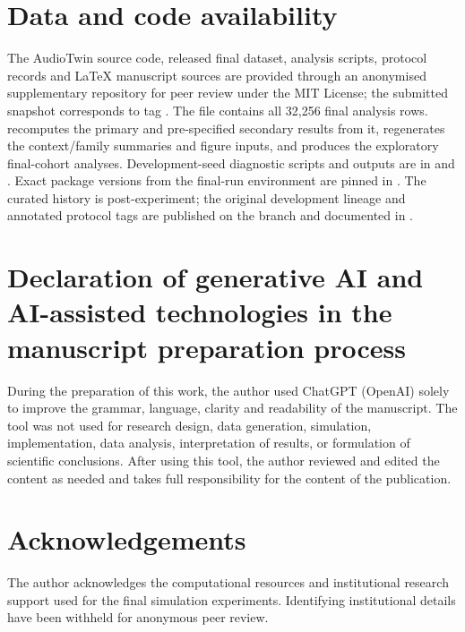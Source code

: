 \documentclass[preprint,12pt]{elsarticle}
\begin{document}
\section*{Data and code availability}
The AudioTwin source code, released final dataset, analysis scripts, protocol records and LaTeX manuscript sources are provided through an anonymised supplementary repository for peer review under the MIT License; the submitted snapshot corresponds to tag . The file  contains all 32,256 final analysis rows.  recomputes the primary and pre-specified secondary results from it,  regenerates the context/family summaries and figure inputs, and  produces the exploratory final-cohort analyses. Development-seed diagnostic scripts and outputs are in  and . Exact package versions from the final-run environment are pinned in . The curated  history is post-experiment; the original development lineage and annotated protocol tags are published on the  branch and documented in .

\section*{Declaration of generative AI and AI-assisted technologies in the manuscript preparation process}
During the preparation of this work, the author used ChatGPT (OpenAI) solely to improve
the grammar, language, clarity and readability of the manuscript. The tool was not used for
research design, data generation, simulation, implementation, data analysis, interpretation of
results, or formulation of scientific conclusions. After using this tool, the author reviewed and
edited the content as needed and takes full responsibility for the content of the publication.


\section*{Acknowledgements}
The author acknowledges the computational resources and institutional research support used for the final simulation experiments. Identifying institutional details have been withheld for anonymous peer review.

\appendix
\end{document}
